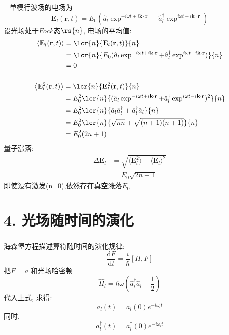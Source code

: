 \begin{frame}
    \frametitle{}
    \解~ 单模行波场的电场为
    \[ \mathbf{E}_l(\mathbf{r},t) = E_{0} (\hat{a}_l\exp^{-i \omega t + i \mathbf{k}\cdot \mathbf{r}} + \hat{a}_l ^\dagger \exp^{i \omega t - i \mathbf{k}\cdot \mathbf{r}})\]
    设光场处于$Fock$态$\rs{n}$, 电场的平均值: 
  \[ 
  \begin{aligned}
          \left\langle \mathbf{E}_l(\mathbf{r},t) \right\rangle &=\lcr{n}{\mathbf{E}_l(\mathbf{r},t)}{n} \\  
          &= \lcr{n}{E_{0} (\hat{a}_l \exp^{-i \omega t + i \mathbf{k}\cdot \mathbf{r}} +\hat{a}_l ^\dagger \exp^{i \omega t - i \mathbf{k}\cdot \mathbf{r}})}{n}\\ 
          &=0 
  \end{aligned}\]
\end{frame}

\begin{frame}
    \frametitle{}
    \[ \begin{aligned}
      \left\langle \mathbf{E}^2_l(\mathbf{r},t) \right\rangle &=\lcr{n}{\mathbf{E}^2_l(\mathbf{r},t)}{n} \\  
      &= E^2_{0} \lcr{n}{(\hat{a}_l \exp^{-i \omega t + i \mathbf{k}\cdot \mathbf{r}} +\hat{a}_l ^\dagger \exp^{i \omega t - i \mathbf{k}\cdot \mathbf{r}})^2}{n}\\ 
      &= E^2_{0} \lcr{n}{\hat{a}_l\hat{a}_l ^\dagger + \hat{a}_l ^\dagger \hat{a}_l}{n}\\ 
      &= E^2_{0} \lcr{n}{\sqrt{nn} + \sqrt{(n+1)(n+1)}}{n}\\ 
      &= E^2_{0} (2n+1)
\end{aligned}\]
量子涨落: 
\[
\begin{aligned}
      \Delta \mathbf{E}_l &= \sqrt{\langle \mathbf{E}^2 _l \rangle - \langle \mathbf{E}_l \rangle ^2} \\
      &= E_0 \sqrt{2n+1}
\end{aligned} \]
即使没有激发(n=0),依然存在真空涨落$ E_0 $  
\end{frame}

\section{4. 光场随时间的演化}

\begin{frame}
 \frametitle{}
 海森堡方程描述算符随时间的演化规律:
 \[ \frac{\mathrm{d}F}{\mathrm{d}t} = \frac{i}{\hbar}[H,F] \]
 把$F= a $ 和光场哈密顿 \[\hat{H}_l= \hbar \omega \left(\hat{a}^\dagger _l \hat{a} _l + \frac{1 }{2}\right) \]
 代入上式, 求得:
 \[ a_{l}(t)=a_{l}(0) e^{-i \omega_{l} t} \]  
 同时,  
 \[ a ^\dagger _{l}(t)=a ^\dagger _{l}(0) e^{-i \omega_{l} t} \]  
\end{frame}

